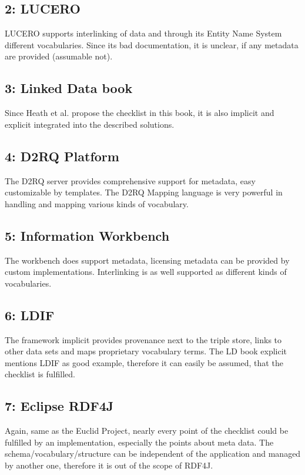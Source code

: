 \subsection*{2: LUCERO}
LUCERO supports interlinking of data and through its Entity Name System different vocabularies. Since its bad documentation, it is unclear, if any metadata are provided (assumable not).

\subsection*{3: Linked Data book}
Since Heath et al. propose the checklist in this book, it is also implicit and explicit integrated into the described solutions.

\subsection*{4: D2RQ Platform}
The D2RQ server provides comprehensive support for metadata, easy customizable by templates. The D2RQ Mapping language is very powerful in handling and mapping various kinds of vocabulary.

\subsection*{5: Information Workbench}
The workbench does support metadata, licensing metadata can be provided by custom implementations. Interlinking is as well supported as different kinds of vocabularies.

\subsection*{6: LDIF}
The framework implicit provides provenance next to the triple store, links to other data sets and maps proprietary vocabulary terms. The LD book explicit mentions LDIF as good example, therefore it can easily be assumed, that the checklist is fulfilled.

\subsection*{7: Eclipse RDF4J}
Again, same as the Euclid Project, nearly every point of the checklist could be fulfilled by an implementation, especially the points about meta data. The schema/vocabulary/structure can be independent of the application and managed by another one, therefore it is out of the scope of RDF4J.

